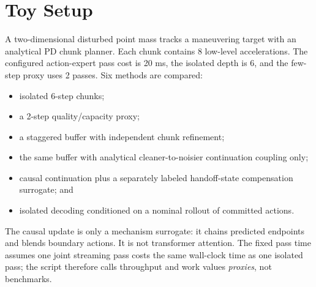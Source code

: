 \documentclass[11pt]{article}
\begin{document}
\section{Toy Setup}
A two-dimensional disturbed point mass tracks a maneuvering target with an analytical PD chunk planner. Each chunk contains 8 low-level accelerations. The configured action-expert pass cost is 20 ms, the isolated depth is 6, and the few-step proxy uses 2 passes. Six methods are compared:
\begin{itemize}[leftmargin=1.5em]
\item isolated 6-step chunks;
\item a 2-step quality/capacity proxy;
\item a staggered buffer with independent chunk refinement;
\item the same buffer with analytical cleaner-to-noisier continuation coupling only;
\item causal continuation plus a separately labeled handoff-state compensation surrogate; and
\item isolated decoding conditioned on a nominal rollout of committed actions.
\end{itemize}
The causal update is only a mechanism surrogate: it chains predicted endpoints and blends boundary actions. It is not transformer attention. The fixed pass time assumes one joint streaming pass costs the same wall-clock time as one isolated pass; the script therefore calls throughput and work values \emph{proxies}, not benchmarks.
\end{document}
